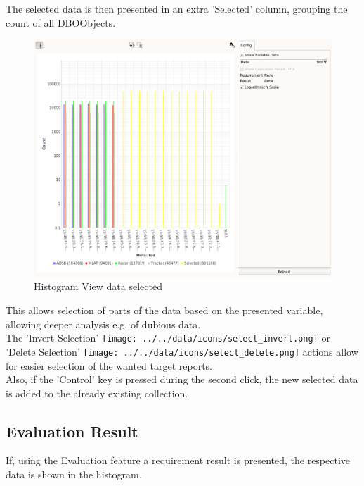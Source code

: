 The selected data is then presented in an extra 'Selected' column, grouping the count of all DBOObjects.

\begin{figure}[H]
    \hspace*{-2cm}
    \includegraphics[width=18cm,frame]{figures/histogram_selected.png}
  \caption{Histogram View data selected}
\end{figure}

This allows selection of parts of the data based on the presented variable, allowing deeper analysis e.g. of dubious data. \\

The 'Invert Selection' \texttt{[image: ../../data/icons/select\_invert.png]} or 'Delete Selection' \texttt{[image: ../../data/icons/select\_delete.png]} actions allow for easier selection of the wanted target reports. \\

Also, if the 'Control' key is pressed during the second click, the new selected data is added to the already existing collection.

\subsection{Evaluation Result}

If, using the Evaluation feature a requirement result is presented, the respective data is shown in the histogram.

